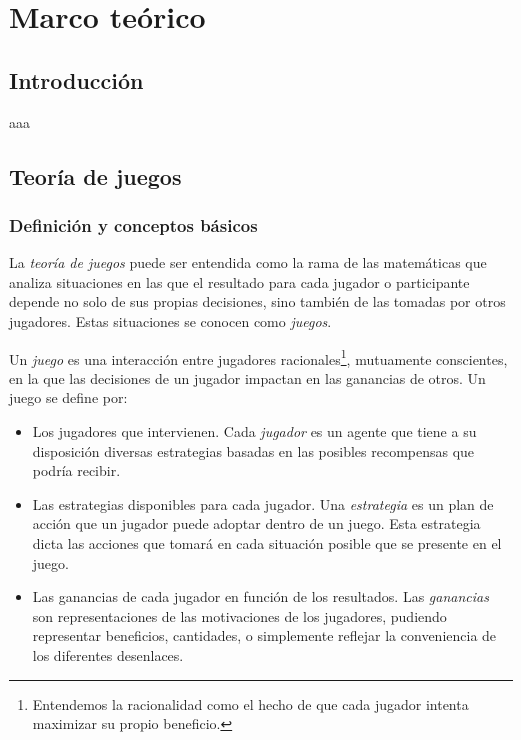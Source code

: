 \chapter{Marco teórico}
\justifying

\section*{Introducción}

aaa

\section{Teoría de juegos}
\subsection*{Definición y conceptos básicos}

La \emph{teoría de juegos} puede ser entendida como la rama de las
matemáticas que analiza situaciones en las que el resultado para
cada jugador o participante depende no solo de sus propias
decisiones, sino también de las tomadas por otros
jugadores. Estas situaciones se conocen como \emph{juegos}.

\begin{definition}
  Un \emph{juego} es una interacción entre jugadores
  racionales\footnote{Entendemos la racionalidad como el
  hecho de que cada jugador intenta maximizar su propio
  beneficio.}, mutuamente conscientes, en la que las
  decisiones de un jugador impactan en las ganancias de
  otros. Un juego se define por:
  \begin{itemize}
    \item Los jugadores que intervienen. Cada \emph{jugador}
      es un agente que tiene a su disposición diversas
      estrategias basadas en las posibles recompensas que
      podría recibir.

    \item Las estrategias disponibles para cada jugador.
      Una \emph{estrategia} es un plan de acción que un jugador
      puede adoptar dentro de un juego. Esta estrategia dicta las
      acciones que tomará en cada situación posible que se presente
      en el juego.

    \item Las ganancias de cada jugador en función de los
      resultados. Las \emph{ganancias} son representaciones de
      las motivaciones de los jugadores, pudiendo representar
      beneficios, cantidades, o simplemente reflejar la conveniencia
      de los diferentes desenlaces.
  \end{itemize}
\end{definition}

